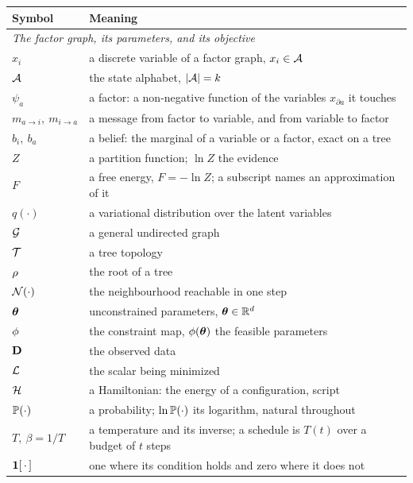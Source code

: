 \documentclass[11pt,a4paper]{article}
\begin{document}
\begin{table}[htbp]
  \centering
  \footnotesize
  \begin{tabular}{ll}
    \toprule
    Symbol & Meaning \\
    \midrule
    \multicolumn{2}{l}{\emph{The factor graph, its parameters, and its objective}} \\
    $x_i$          & a discrete variable of a factor graph, $x_i \in \mathcal{A}$ \\
    $\mathcal{A}$      & the state alphabet, $|\mathcal{A}| = k$ \\
    $\psi_a$       & a factor: a non-negative function of the variables $x_{\partial a}$ it touches \\
    $m_{a \to i},\ m_{i \to a}$ & a message from factor to variable, and from variable to factor \\
    $b_i,\ b_a$    & a belief: the marginal of a variable or a factor, exact on a tree \\
    $Z$            & a partition function; $\ln Z$ the evidence \\
    $F$            & a free energy, $F = -\ln Z$; a subscript names an approximation of it \\
    $q(\cdot)$     & a variational distribution over the latent variables \\
    $\mathcal{G}$       & a general undirected graph \\
    $\mathcal{T}$        & a tree topology \\
    $\rho$    & the root of a tree \\
    $\mathcal{N}(\cdot)$ & the neighbourhood reachable in one step \\
    $\boldsymbol{\theta}$      & unconstrained parameters, $\boldsymbol{\theta} \in \mathbb{R}^d$ \\
    $\phi$ & the constraint map, $\phi(\boldsymbol{\theta})$ the feasible parameters \\
    $\mathbf{D}$        & the observed data \\
    $\mathcal{L}$   & the scalar being minimized \\
    $\mathcal{H}$      & a Hamiltonian: the energy of a configuration, script \\
    $\mathbb{P}(\cdot)$ & a probability; $\ln \mathbb{P}(\cdot)$ its logarithm, natural throughout \\
    $T,\ \beta = 1/T$ & a temperature and its inverse; a schedule is $T(t)$ over a budget of $t$ steps \\
    $\mathbf{1}[\,\cdot\,]$ & one where its condition holds and zero where it does not \\

\end{tabular}
\end{table}
\end{document}
